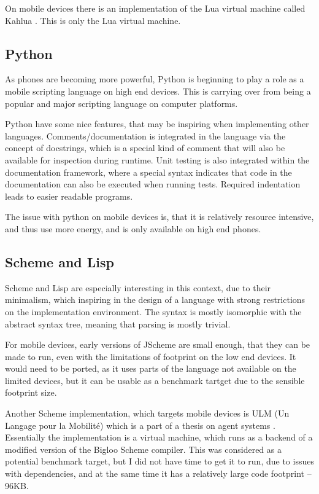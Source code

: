 \documentclass[11pt]{report}
\begin{document}
On mobile devices there is an implementation of the Lua virtual machine called Kahlua \cite{kahlua}.
This is only the Lua virtual machine.

\subsection{Python}
As phones are becoming more powerful, Python is beginning to play a role as a mobile scripting language on high end devices. This is carrying over from being a popular and major scripting language on computer platforms.

Python have some nice features, that may be inspiring when implementing other languages. Comments/documentation is integrated in the language via the concept of docstrings, which is a special kind of comment that will also be available for inspection during runtime. Unit testing is also integrated within the documentation framework, where a special syntax indicates that code in the documentation can also be executed when running tests.
Required indentation leads to easier readable programs.

The issue with python on mobile devices is, that it is relatively resource intensive, and thus use more energy, and is only available on high end phones.

\subsection{Scheme and Lisp}
Scheme and Lisp are especially interesting in this context, due to their minimalism, which inspiring in the design of a language with strong restrictions on the implementation environment.
The syntax is mostly isomorphic with the abstract syntax tree, meaning that parsing is mostly trivial.

For mobile devices, early versions of JScheme \cite{norvig-jscheme} are small enough, that they can be made to run, even with the limitations of footprint on the low end devices. It would need to be ported, as it uses parts of the language not available on the limited devices, but it can be usable as a benchmark tartget due to the sensible footprint size.

Another Scheme implementation, which targets mobile devices is ULM (Un Langage pour la Mobilité) which is a part of a thesis on agent systems \cite{ulm}. Essentially the implementation is a virtual machine, which runs as a backend of a modified version of the Bigloo \cite{bigloo} Scheme compiler.
This was considered as a potential benchmark target, but I did not have time to get it to run, due to issues with dependencies, and at the same time it has a relatively large code footprint -- 96KB.
\end{document}
